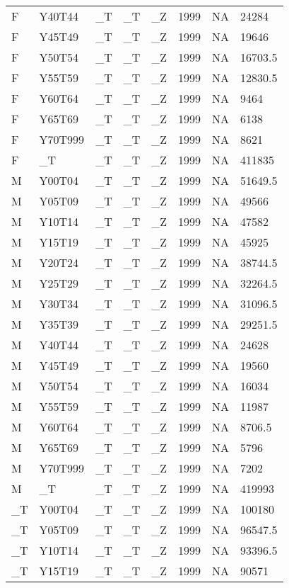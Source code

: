 \begin{longtable}[t]{llllllll}
F & Y40T44 & \_T & \_T & \_Z & 1999 & NA & 24284\\
F & Y45T49 & \_T & \_T & \_Z & 1999 & NA & 19646\\
F & Y50T54 & \_T & \_T & \_Z & 1999 & NA & 16703.5\\
F & Y55T59 & \_T & \_T & \_Z & 1999 & NA & 12830.5\\
\addlinespace
F & Y60T64 & \_T & \_T & \_Z & 1999 & NA & 9464\\
F & Y65T69 & \_T & \_T & \_Z & 1999 & NA & 6138\\
F & Y70T999 & \_T & \_T & \_Z & 1999 & NA & 8621\\
F & \_T & \_T & \_T & \_Z & 1999 & NA & 411835\\
M & Y00T04 & \_T & \_T & \_Z & 1999 & NA & 51649.5\\
\addlinespace
M & Y05T09 & \_T & \_T & \_Z & 1999 & NA & 49566\\
M & Y10T14 & \_T & \_T & \_Z & 1999 & NA & 47582\\
M & Y15T19 & \_T & \_T & \_Z & 1999 & NA & 45925\\
M & Y20T24 & \_T & \_T & \_Z & 1999 & NA & 38744.5\\
M & Y25T29 & \_T & \_T & \_Z & 1999 & NA & 32264.5\\
\addlinespace
M & Y30T34 & \_T & \_T & \_Z & 1999 & NA & 31096.5\\
M & Y35T39 & \_T & \_T & \_Z & 1999 & NA & 29251.5\\
M & Y40T44 & \_T & \_T & \_Z & 1999 & NA & 24628\\
M & Y45T49 & \_T & \_T & \_Z & 1999 & NA & 19560\\
M & Y50T54 & \_T & \_T & \_Z & 1999 & NA & 16034\\
\addlinespace
M & Y55T59 & \_T & \_T & \_Z & 1999 & NA & 11987\\
M & Y60T64 & \_T & \_T & \_Z & 1999 & NA & 8706.5\\
M & Y65T69 & \_T & \_T & \_Z & 1999 & NA & 5796\\
M & Y70T999 & \_T & \_T & \_Z & 1999 & NA & 7202\\
M & \_T & \_T & \_T & \_Z & 1999 & NA & 419993\\
\addlinespace
\_T & Y00T04 & \_T & \_T & \_Z & 1999 & NA & 100180\\
\_T & Y05T09 & \_T & \_T & \_Z & 1999 & NA & 96547.5\\
\_T & Y10T14 & \_T & \_T & \_Z & 1999 & NA & 93396.5\\
\_T & Y15T19 & \_T & \_T & \_Z & 1999 & NA & 90571\\

\end{longtable}
